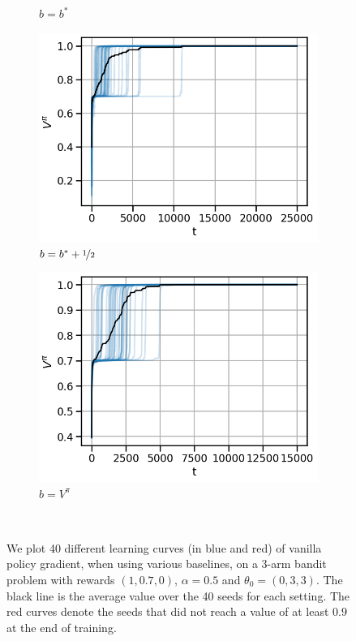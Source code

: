 \begin{figure}[!ht]
\begin{subfigure}[b]{0.245\linewidth}
    \caption{$b = b^\ast$}
  \end{subfigure}
  \begin{subfigure}[b]{0.245\linewidth}
    \includegraphics[width=\textwidth]{articles/baselines/figs/appendix_figs_3arm_033/vanilla_minvar_05_eta=05.png}
    \caption{$b = b^\ast + \nicefrac{1}{2}$}
  \end{subfigure}
  \begin{subfigure}[b]{0.245\linewidth}
    \includegraphics[width=\textwidth]{articles/baselines/figs/appendix_figs_3arm_033/vanilla_value_0_eta=05.png}
    \caption{$b=V^\pi$}
  \end{subfigure}
  \caption{We plot 40 different learning curves (in blue and red) of vanilla policy gradient, when using various baselines, on a 3-arm bandit problem with rewards $(1, 0.7, 0)$, $\alpha = 0.5$ and $\theta_0 = (0, 3, 3)$. The black line is the average value over the 40 seeds for each setting. The red curves denote the seeds that did not reach a value of at least $0.9$ at the end of training.}~\label{appfig:learning_curves_vpg_033}
\end{figure}




